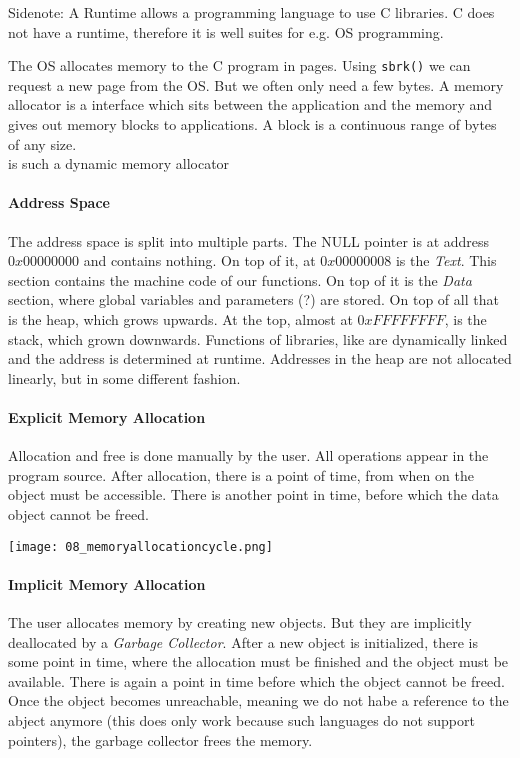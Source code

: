 


Sidenote: A Runtime allows a programming language to use C libraries. C does not have a runtime, therefore it is well suites for e.g. OS programming.

The OS allocates memory to the C program in pages. Using \verb+sbrk()+ we can request a new page from the OS. But we often only need a few bytes. A memory allocator is a interface which sits between the application and the memory and gives out memory blocks to applications. A block is a continuous range of bytes of any size.\\
 is such a dynamic memory allocator

\paragraph{Address Space}
The address space is split into multiple parts. The NULL pointer is at address $0x00000000$ and contains nothing. On top of it, at $0x00000008$ is the \textit{Text}. This section contains the machine code of our functions. On top of it is the \textit{Data} section, where global variables and parameters (?) are stored. On top of all that is the heap, which grows upwards. At the top, almost at $0xFFFFFFFF$, is the stack, which grown downwards. Functions of libraries, like  are dynamically linked and the address is determined at runtime. Addresses in the heap are not allocated linearly, but in some different fashion.

\paragraph{Explicit Memory Allocation}
Allocation and free is done manually by the user. All operations appear in the program source. After allocation, there is a point of time, from when on the object must be accessible. There is another point in time, before which the data object cannot be freed.

\texttt{[image: 08\_memoryallocationcycle.png]}

\paragraph{Implicit Memory Allocation}
The user allocates memory by creating new objects. But they are implicitly deallocated by a \textit{Garbage Collector}. After a new object is initialized, there is some point in time, where the allocation must be finished and the object must be available. There is again a point in time before which the object cannot be freed. Once the object becomes unreachable, meaning we do not habe a reference to the abject anymore (this does only work because such languages do not support pointers), the garbage collector frees the memory.

